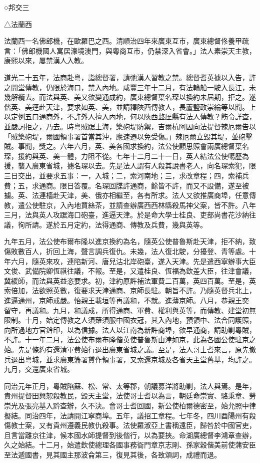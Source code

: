 
\begin{pinyinscope}
○邦交三

△法蘭西

法蘭西一名佛郎機，在歐羅巴之西。清順治四年來廣東互巿，廣東總督佟養甲疏言：「佛郎機國人寓居濠境澳門，與粵商互巿，仍禁深入省會。」法人素崇天主教，康熙以來，屢禁漢人入教。

道光二十五年，法商赴粵，詣總督署，請弛漢人習教之禁。總督耆英據以入告，許之開堂傳教，仍限於海口，禁入內地。咸豐三年十二月，有法輪船一駛入長江，未幾解纜去。而法與英、美又欲變通成約，廣東總督葉名琛以換約未屆期，拒之。遂偕英、美逕赴天津，要求如英、美，並請釋陜西傳教人，長蘆鹽政崇綸等以聞。上以定例五口通商外，不許外人擅入內地，何以陜西盩厔縣有法人傳教？飭令詳查，並嚴詞拒之，乃去。時粵賊踞上海，築砲堤防禦，吉爾杭阿因向法提督辣厄爾告以「賊築砲堤，爾國領事署首當其沖，應速遷以免受傷。」辣厄爾立毀其堤，並砲擊賊。事聞，獎之。六年六月，英、美各國求換約，法公使顧思照會兩廣總督葉名琛，援約與英、美一體，力阻不從。七年十二月二十一日，英人結法公使噶歷為援，襲入廣東省城，擄名琛以去。先是法人謂有人殺其說書老人，向名琛索犯，限三日交出，並要求五事：一，入城；二，索河南地；三，求改章程；四，索補兵費；五，求通商。限日答覆。名琛回牒許通商，餘皆不許，而又不設備，遂至被擄。英、法連檣赴天津，美、俄亦相繼至，各有所求。法人又欲推廣商埠，任意傳教，遣公使駐京，入內地買絲茶，並請查辦廣西西林縣殺馬神父案，皆不許。八年三月，法與英人攻踞海口砲臺，進逼天津。於是命大學士桂良、吏部尚書花沙納往議，徇所請。遂於五月定約，法得通商、傳教及兵費，幾與英等。

九年五月，法公使布爾布隆以進京換約為名，隨英公使普魯斯赴天津，拒不納，致傷敗數百人，折回上海，聲言調兵復仇。未幾，法人復北駛，分擾登、青等處。十年六月，隨英來攻，連陷新河、唐兒沽北岸砲臺，遂入天津。先是遣西寧辦事大臣文俊、武備院卿恆祺往議，不報。至是，又遣桂良、恆福為欽差大臣，往津會議，冀緩師，而法與英益恣要求。初，津約原許補法軍費二百萬，英四百萬。至是，英索倍加，法欲照英數，復要求天津通商、京師長駐。朝旨不許。乃隨英督兵北上，進逼通州，京師戒嚴。怡親王載垣等再議和，不就。進薄京師。八月，恭親王奕留守，再議和。九月，和議成，所得通商、軍費、權利與英等，而傳教、建堂初無限制。十月，始定傳教之人須薙須服中國衣冠，其入內地，預領中、法合同護照，向所過地方官鈐印，以為信據。法人以江南為新許商埠，欲早通商，請助剿粵賊，不許。十一年二月，法公使布爾布隆偕英使普魯斯由津如京，此為各國公使駐京之始。先是條約有還清軍費始行退出廣東省城之議。至是，法人哥士耆來言，原先撤兵退出粵城，並求廣東籓署賃作領事署，又索還京城及各省天主堂舊基，均許之。九月，交還廣東省城。

同治元年正月，粵賊陷蘇、松、常、太等郡，朝議募洋將助剿，法人與焉。是年，貴州提督田興恕殺教民，毀天主堂，法使哥士耆以為言，朝廷命崇實、駱秉章、勞崇光及張亮基入黔查辦，久不決。會哥士耆回國，新公使柏爾德密至，始允照中律擬結。同治四年，法請開江寧商埠。五年，議招工章程。七年冬，四川酉陽州有殺傷教士案，又有貴州遵義民教仇殺事。法使羅淑亞上書稱遠臣，歸咎於中國官吏，且言當離京往津，候本國水師提督到後偕行，以為要挾。命湖廣總督李鴻章查辦，久之始結。十二月，始遣欽使總理各國事務衙門章京志剛、孫家穀偕美前使蒲安臣至法遞國書，見其國主那波侖第三，復見其後，各致頌詞，成禮而退。


\end{pinyinscope}
